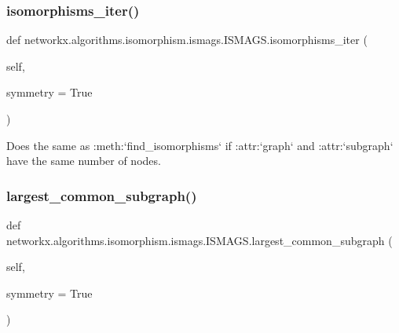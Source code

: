 \subsubsection{\texorpdfstring{isomorphisms\+\_\+iter()}{isomorphisms\_iter()}}
{\footnotesize\ttfamily def networkx.\+algorithms.\+isomorphism.\+ismags.\+I\+S\+M\+A\+G\+S.\+isomorphisms\+\_\+iter (\begin{DoxyParamCaption}\item[{}]{self,  }\item[{}]{symmetry = {\ttfamily True} }\end{DoxyParamCaption})}

\begin{DoxyVerb}Does the same as :meth:`find_isomorphisms` if :attr:`graph` and
:attr:`subgraph` have the same number of nodes.
\end{DoxyVerb}
 \mbox{\label{classnetworkx_1_1algorithms_1_1isomorphism_1_1ismags_1_1ISMAGS_a8bfe525305af3eea7a03d2045c84ca8e}} 
\subsubsection{\texorpdfstring{largest\+\_\+common\+\_\+subgraph()}{largest\_common\_subgraph()}}
{\footnotesize\ttfamily def networkx.\+algorithms.\+isomorphism.\+ismags.\+I\+S\+M\+A\+G\+S.\+largest\+\_\+common\+\_\+subgraph (\begin{DoxyParamCaption}\item[{}]{self,  }\item[{}]{symmetry = {\ttfamily True} }\end{DoxyParamCaption})}

